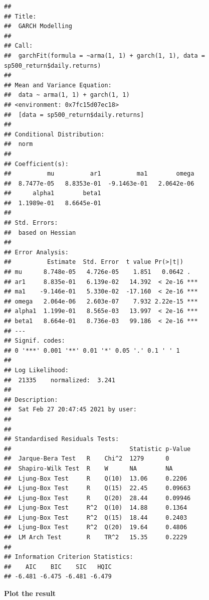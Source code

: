 \documentclass[]{book}
\begin{document}
\begin{verbatim}
## 
## Title:
##  GARCH Modelling 
## 
## Call:
##  garchFit(formula = ~arma(1, 1) + garch(1, 1), data = sp500_return$daily.returns) 
## 
## Mean and Variance Equation:
##  data ~ arma(1, 1) + garch(1, 1)
## <environment: 0x7fc15d07ec18>
##  [data = sp500_return$daily.returns]
## 
## Conditional Distribution:
##  norm 
## 
## Coefficient(s):
##          mu          ar1          ma1        omega  
##  8.7477e-05   8.8353e-01  -9.1463e-01   2.0642e-06  
##      alpha1        beta1  
##  1.1989e-01   8.6645e-01  
## 
## Std. Errors:
##  based on Hessian 
## 
## Error Analysis:
##          Estimate  Std. Error  t value Pr(>|t|)    
## mu      8.748e-05   4.726e-05    1.851   0.0642 .  
## ar1     8.835e-01   6.139e-02   14.392  < 2e-16 ***
## ma1    -9.146e-01   5.330e-02  -17.160  < 2e-16 ***
## omega   2.064e-06   2.603e-07    7.932 2.22e-15 ***
## alpha1  1.199e-01   8.565e-03   13.997  < 2e-16 ***
## beta1   8.664e-01   8.736e-03   99.186  < 2e-16 ***
## ---
## Signif. codes:  
## 0 '***' 0.001 '**' 0.01 '*' 0.05 '.' 0.1 ' ' 1
## 
## Log Likelihood:
##  21335    normalized:  3.241 
## 
## Description:
##  Sat Feb 27 20:47:45 2021 by user:  
## 
## 
## Standardised Residuals Tests:
##                                 Statistic p-Value
##  Jarque-Bera Test   R    Chi^2  1279      0      
##  Shapiro-Wilk Test  R    W      NA        NA     
##  Ljung-Box Test     R    Q(10)  13.06     0.2206 
##  Ljung-Box Test     R    Q(15)  22.45     0.09663
##  Ljung-Box Test     R    Q(20)  28.44     0.09946
##  Ljung-Box Test     R^2  Q(10)  14.88     0.1364 
##  Ljung-Box Test     R^2  Q(15)  18.44     0.2403 
##  Ljung-Box Test     R^2  Q(20)  19.64     0.4806 
##  LM Arch Test       R    TR^2   15.35     0.2229 
## 
## Information Criterion Statistics:
##    AIC    BIC    SIC   HQIC 
## -6.481 -6.475 -6.481 -6.479
\end{verbatim}

\textbf{Plot the result}
\end{document}
